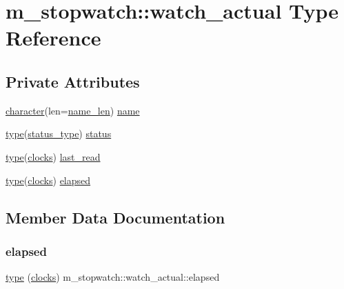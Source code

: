 \hypertarget{structm__stopwatch_1_1watch__actual}{}\section{m\+\_\+stopwatch\+:\+:watch\+\_\+actual Type Reference}
\label{structm__stopwatch_1_1watch__actual}
\subsection*{Private Attributes}
\begin{DoxyCompactItemize}
\item 
\hyperlink{option__stopwatch_83_8txt_abd4b21fbbd175834027b5224bfe97e66}{character}(len=\hyperlink{namespacem__stopwatch_a90c3eba08ec94bd1499d3afcd621d045}{name\+\_\+len}) \hyperlink{structm__stopwatch_1_1watch__actual_a991c67cbbf530fe7690d0e20d82acd83}{name}
\item 
\hyperlink{stop__watch_83_8txt_a70f0ead91c32e25323c03265aa302c1c}{type}(\hyperlink{structm__stopwatch_1_1status__type}{status\+\_\+type}) \hyperlink{structm__stopwatch_1_1watch__actual_aa5946ce38edc266e09dfc0a12a33710c}{status}
\item 
\hyperlink{stop__watch_83_8txt_a70f0ead91c32e25323c03265aa302c1c}{type}(\hyperlink{structm__stopwatch_1_1clocks}{clocks}) \hyperlink{structm__stopwatch_1_1watch__actual_ae1d38c1b64f646e6342283c24ad3eaad}{last\+\_\+read}
\item 
\hyperlink{stop__watch_83_8txt_a70f0ead91c32e25323c03265aa302c1c}{type}(\hyperlink{structm__stopwatch_1_1clocks}{clocks}) \hyperlink{structm__stopwatch_1_1watch__actual_a092bd61ab45253b2851f5999f44e6a72}{elapsed}
\end{DoxyCompactItemize}


\subsection{Member Data Documentation}
\mbox{\label{structm__stopwatch_1_1watch__actual_a092bd61ab45253b2851f5999f44e6a72}} 
\subsubsection{\texorpdfstring{elapsed}{elapsed}}
{\footnotesize\ttfamily \hyperlink{stop__watch_83_8txt_a70f0ead91c32e25323c03265aa302c1c}{type} (\hyperlink{structm__stopwatch_1_1clocks}{clocks}) m\+\_\+stopwatch\+::watch\+\_\+actual\+::elapsed\hspace{0.3cm}{\ttfamily [private]}}

